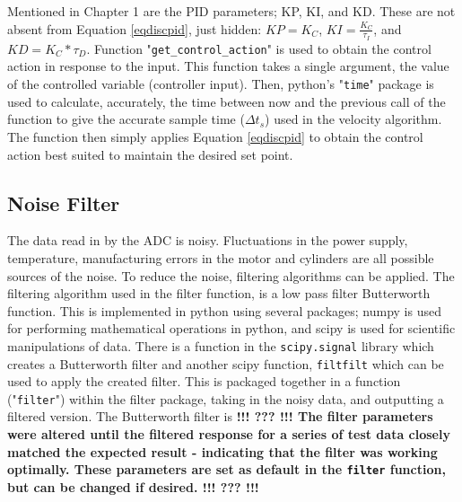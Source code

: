 \documentclass[twoside,a4]{report}
\def\br{\newline \newline \noindent}
\def\cbh{\large\bfseries !!! ??? !!! \normalsize\normalfont}
\begin{document}
	\noindent
	Mentioned in Chapter 1 are the PID parameters; KP, KI, and KD. These are not absent from Equation \ref{eqdiscpid}, just hidden: \(KP = K_C\), \(KI = \frac{K_C}{\tau _I}\), and \(KD = K_C * \tau _D\).\br
	Function "\texttt{get\_control\_action}" is used to obtain the control action in response to the input. This function takes a single argument, the value of the controlled variable (controller input). Then, python's "\texttt{time}" package is used to calculate, accurately, the time between now and the previous call of the function to give the accurate sample time (\(\Delta t_s\)) used in the velocity algorithm. The function then simply applies Equation \ref{eqdiscpid} to obtain the control action best suited to maintain the desired set point.
	
	\subsection*{Noise Filter} %
	The data read in by the ADC is noisy. Fluctuations in the power supply, temperature, manufacturing errors in the motor and cylinders are all possible sources of the noise. To reduce the noise, filtering algorithms can be applied. \br
	The filtering algorithm used in the filter function, is a low pass filter Butterworth function. This is implemented in python using several packages; numpy is used for performing mathematical operations in python, and scipy is used for scientific manipulations of data. \br
	There is a function in the \texttt{scipy.signal} library which creates a Butterworth filter and another scipy function, \texttt{filtfilt} which can be used to apply the created filter. This is packaged together in a function ("\texttt{filter}") within the filter package, taking in the noisy data, and outputting a filtered version. \br
	The Butterworth filter is \cbh \br %
	The filter parameters were altered until the filtered response for a series of test data closely matched the expected result - indicating that the filter was working optimally. These parameters are set as default in the \texttt{filter} function, but can be changed if desired. \cbh %
	
\end{document}

